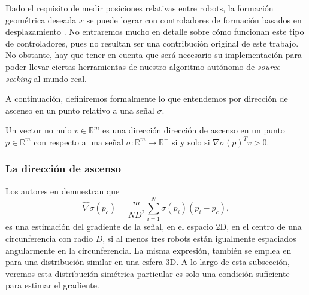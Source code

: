 Dado el requisito de medir posiciones relativas entre robots, la formación geométrica deseada $x$ se puede lograr con controladores de formación basados en desplazamiento \cite{oh2015survey,sun2018circular,C1}. No entraremos mucho en detalle sobre cómo funcionan este tipo de controladores, pues no resultan ser una contribución original de este trabajo. No obstante, hay que tener en cuenta que será necesario su implementación para poder llevar ciertas herramientas de nuestro algoritmo autónomo de \textit{source-seeking} al mundo real.

A continuación, definiremos formalmente lo que entendemos por dirección de ascenso en un punto relativo a una señal $\sigma$.
\begin{definition} \label{def: asc_dir}
Un vector no nulo $v \in \mathbb{R}^m$ es una dirección dirección de ascenso en un punto $p \in \mathbb{R}^m$ con respecto a una señal $\sigma:\mathbb{R}^m \to \mathbb{R}^{+}$ si y solo si $\nabla \sigma(p)^T v > 0$.
\end{definition}


\newpage


\subsubsection{La dirección de ascenso}

Los autores en \cite{brinon2015distributed} demuestran que
\begin{equation}
\hat\nabla\sigma(p_c) = \frac{m}{ND^2}\sum_{i=1}^N \sigma(p_i)(p_i - p_c),
\label{eq: lara}
\end{equation}
es una estimación del gradiente de la señal, en el espacio 2D, en el centro de una circunferencia con radio $D$, si al menos tres robots están igualmente espaciados angularmente en la circunferencia. La misma expresión, también se emplea en \cite{brinon2019multirobot} para una distribución similar en una esfera 3D. A lo largo de esta subsección, veremos esta distribución simétrica particular es solo una condición suficiente para estimar el gradiente.

